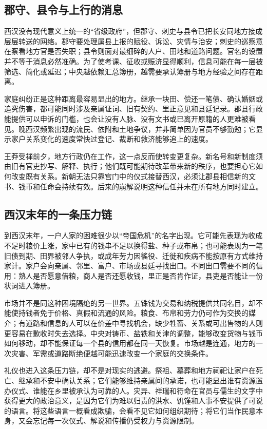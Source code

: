 \subsection{郡守、县令与上行的消息}

西汉没有现代意义上统一的“省级政府”，但郡守、刺史与县令已把长安同地方接成层层转送的网络。郡守要处理属县上报的赋役、诉讼、灾情与治安；刺史的巡察意在察看地方官是否失职；县令则面对最细碎的人户、田地和道路问题。官名的设置并不等于消息必然准确。为了使考课、征收或赈济显得顺利，信息可能在每一层被筛选、简化或延迟；中央越依赖汇总簿册，越需要承认簿册与地方经验之间存在距离。

家庭纠纷正是这种距离最容易显出的地方。继承一块田、偿还一笔债、确认婚姻或追究伤害，都可能同时涉及亲属证词、旧有契约、里正意见和县廷记录。郡县行政能提供可以申诉的门槛，也会让没有人脉、没有文书或已离开原籍的人更难被看见。晚西汉频繁出现的流民、依附和土地争议，并非简单因为官员不够勤勉；它显示家户关系变化的速度常快过登记、裁断和救济能够追上的速度。

王莽受禅前夕，地方行政仍在工作，这一点反而使转变更复杂。新名号和新制度须由旧有官吏抄写、解释、执行；他们既可能期待改革带来新的秩序，也要担心它如何改变既有关系。新朝无法只靠宫门中的仪式接替西汉，必须让郡县相信新的文书、钱币和任命会持续有效。后来的崩解说明这种信任并未在所有地方同时建立。

\subsection{西汉末年的一条压力链}

到西汉末年，一户人家的困难很少以“帝国危机”的名字出现。它可能先表现为收成不足时粮价上涨，家中已有的钱串不足以换得盐、种子或布帛；也可能表现为一笔旧债到期、田界被邻人争执，或成年劳力因徭役、迁徙和疾病不能按原有方式维持家计。家户会向亲属、邻里、富户、市场或县廷寻找出口。不同出口需要不同的信用：熟人是否愿意借粮，商人是否还愿收钱，里正是否肯作证，县吏是否能让一份状词进入簿册。

市场并不是同这种困境隔绝的另一世界。五铢钱为交易和纳税提供共同名目，却不能使持钱者免于价格、真假和流通的风险。粮食、布帛和劳力仍可作为交换的媒介；有道路和信息的人可以在价差中寻找机会，缺少牲畜、关系或可出售物的人则更容易在歉收时失去选择。中央对铸币、盐铁和关津的调整，能够改变货物与钱币如何移动，却不能保证每一个县的信用都在同一天恢复。市场越是连通，地方的一次灾害、军需或道路断绝便越可能迅速改变一个家庭的交换条件。

礼仪也进入这条压力链，却不是对现实的逃避。祭祖、墓葬和地方祠祀让家户在死亡、继承和不安中确认关系；它们能够维持亲属间的承诺，也可能显出谁有资源置办仪式、谁能在乡里被承认为可靠的人。灾异、祥瑞和符命在官员与儒生的文字中获得更大的政治意义，是因为它们为难以归责的洪水、饥馑和人事不安提供了可说的语言。将这些语言一概看成欺骗，会看不见它如何组织期待；将它们当作民意本身，又会忘记每一次仪式、解说和传播仍受权力与资源限制。

